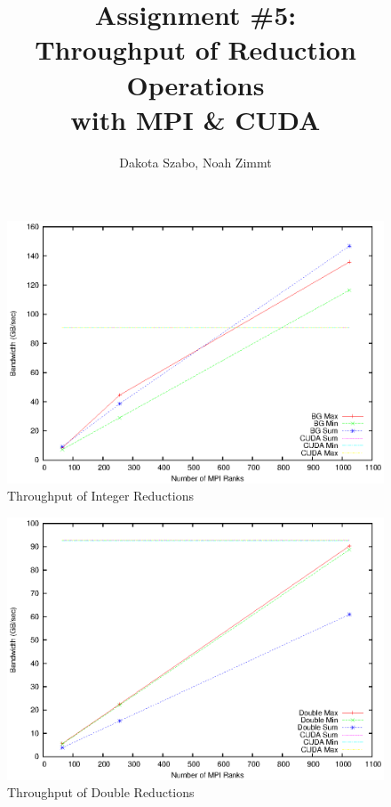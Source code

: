 \documentclass[12pt]{article}
\begin{document}
\author{Dakota Szabo, Noah Zimmt}
\title{ Assignment \#5: \\
	\textbf{
		Throughput of Reduction Operations \\
		with MPI \& CUDA
	}
}
\maketitle

\begin{figure}
	\includegraphics[width=\textwidth]{mpi/int.eps}
	\caption{Throughput of Integer Reductions}
\end{figure}

\begin{figure}
	\includegraphics[width=\textwidth]{mpi/double.eps}
	\caption{Throughput of Double Reductions}

\end{figure}
\end{document}
